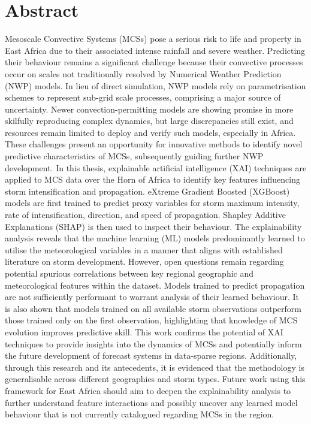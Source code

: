 \chapter*{\center \Large  Abstract}

\noindent
Mesoscale Convective Systems (MCSs) pose a serious risk to life and property in East Africa due to their associated intense rainfall and severe weather. Predicting their behaviour remains a significant challenge because their convective processes occur on scales not traditionally resolved by Numerical Weather Prediction (NWP) models. In lieu of direct simulation, NWP models rely on parametrisation schemes to represent sub-grid scale processes, comprising a major source of uncertainty. Newer convection-permitting models are showing promise in more skilfully reproducing complex dynamics, but large discrepancies still exist, and resources remain limited to deploy and verify such models, especially in Africa. These challenges present an opportunity for innovative methods to identify novel predictive characteristics of MCSs, subsequently guiding further NWP development. In this thesis, explainable artificial intelligence (XAI) techniques are applied to MCS data over the Horn of Africa to identify key features influencing storm intensification and propagation. eXtreme Gradient Boosted (XGBoost) models are first trained to predict proxy variables for storm maximum intensity, rate of intensification, direction, and speed of propagation. Shapley Additive Explanations (SHAP) is then used to inspect their behaviour. The explainability analysis reveals that the machine learning (ML) models predominantly learned to utilise the meteorological variables in a manner that aligns with established literature on storm development. However, open questions remain regarding potential spurious correlations between key regional geographic and meteorological features within the dataset. Models trained to predict propagation are not sufficiently performant to warrant analysis of their learned behaviour. It is also shown that models trained on all available storm observations outperform those trained only on the first observation, highlighting that knowledge of MCS evolution improves predictive skill. This work confirms the potential of XAI techniques to provide insights into the dynamics of MCSs and potentially inform the future development of forecast systems in data-sparse regions. Additionally, through this research and its antecedents, it is evidenced that the methodology is generalisable across different geographies and storm types. Future work using this framework for East Africa should aim to deepen the explainability analysis to further understand feature interactions and possibly uncover any learned model behaviour that is not currently catalogued regarding MCSs in the region.


